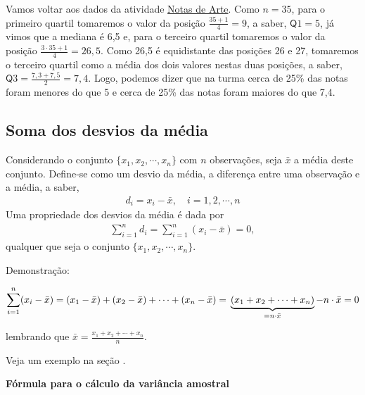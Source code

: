 Vamos voltar aos dados da atividade \hyperref[\detokenize{PE104-0:ativ-notas-de-artes}]{Notas de Arte}. Como \(n=35\), para o primeiro quartil tomaremos o valor da posição \(\frac{35+1}{4}=9\), a saber, \(\textsf{Q}1=5\), já vimos que a mediana é 6,5 e, para o terceiro quartil tomaremos o valor da posição \(\frac{3\cdot 35+1}{4}=26,5\). Como 26,5 é equidistante das posições 26 e 27, tomaremos o terceiro quartil como a média dos dois valores nestas duas posições, a saber, \(\textsf{Q}3=\frac{7,3+7,5}{2}=7,4\). Logo, podemos dizer que na turma cerca de 25\% das notas foram menores do que 5 e cerca de 25\% das notas foram maiores do que 7,4.

\subsection{Soma dos desvios da média}

Considerando o conjunto \(\{ x_1,x_2,\cdots, x_n\}\) com \(n\) observações, seja \(\bar{x}\) a média deste conjunto.  Define-se como um desvio da média, a diferença entre uma observação e a média, a saber,
\begin{equation*}
\begin{split}d_i=x_i-\bar{x}, \quad i=1,2,\cdots, n\end{split}
\end{equation*}
Uma propriedade dos desvios da média é dada por
\begin{equation*}
\begin{split}\sum^n_{i=1}d_i=\sum^n_{i=1}(x_i-\bar{x})=0,\end{split}
\end{equation*}
qualquer que seja o conjunto \(\{ x_1,x_2,\cdots, x_n\}\).

Demonstração:

$$\displaystyle{\sum^n_{i=1}} (x_i-\bar{x})=(x_1-\bar{x})+(x_2-\bar{x})+\cdots+(x_n-\bar{x})=\\ \underbrace{(x_1+x_2+\cdots +x_n)}_{=n\cdot \bar{x}} - n\cdot \bar{x}=0$$

lembrando que \(\displaystyle\bar{x}=\frac{x_1+x_2+\cdots+x_n}{n}\).

Veja um exemplo na seção .

\textbf{Fórmula para o cálculo da variância amostral}

